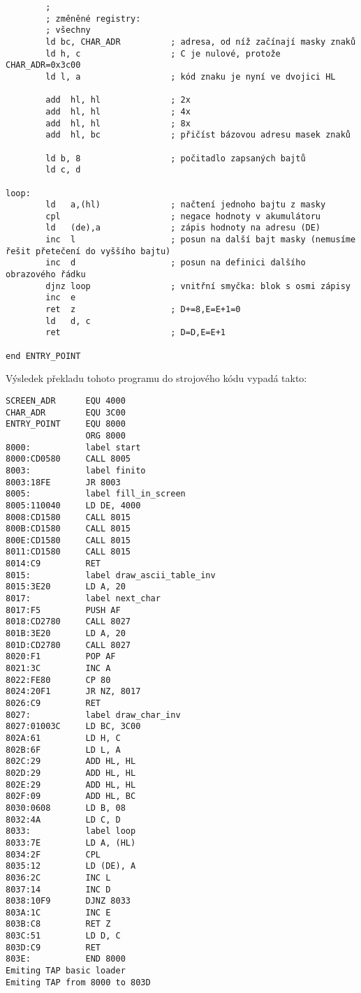 \documentclass{article}
\begin{document}
\begin{verbatim}
        ;
        ; změněné registry:
        ; všechny
        ld bc, CHAR_ADR          ; adresa, od níž začínají masky znaků
        ld h, c                  ; C je nulové, protože CHAR_ADR=0x3c00
        ld l, a                  ; kód znaku je nyní ve dvojici HL
 
        add  hl, hl              ; 2x
        add  hl, hl              ; 4x
        add  hl, hl              ; 8x
        add  hl, bc              ; přičíst bázovou adresu masek znaků
 
        ld b, 8                  ; počitadlo zapsaných bajtů
        ld c, d
 
loop:
        ld   a,(hl)              ; načtení jednoho bajtu z masky
        cpl                      ; negace hodnoty v akumulátoru
        ld   (de),a              ; zápis hodnoty na adresu (DE)
        inc  l                   ; posun na další bajt masky (nemusíme řešit přetečení do vyššího bajtu)
        inc  d                   ; posun na definici dalšího obrazového řádku
        djnz loop                ; vnitřní smyčka: blok s osmi zápisy
        inc  e
        ret  z                   ; D+=8,E=E+1=0
        ld   d, c
        ret                      ; D=D,E=E+1
 
end ENTRY_POINT
\end{verbatim}

Výsledek překladu tohoto programu do strojového kódu vypadá takto:

\begin{verbatim}
SCREEN_ADR      EQU 4000
CHAR_ADR        EQU 3C00
ENTRY_POINT     EQU 8000
                ORG 8000
8000:           label start
8000:CD0580     CALL 8005
8003:           label finito
8003:18FE       JR 8003
8005:           label fill_in_screen
8005:110040     LD DE, 4000
8008:CD1580     CALL 8015
800B:CD1580     CALL 8015
800E:CD1580     CALL 8015
8011:CD1580     CALL 8015
8014:C9         RET
8015:           label draw_ascii_table_inv
8015:3E20       LD A, 20
8017:           label next_char
8017:F5         PUSH AF
8018:CD2780     CALL 8027
801B:3E20       LD A, 20
801D:CD2780     CALL 8027
8020:F1         POP AF
8021:3C         INC A
8022:FE80       CP 80
8024:20F1       JR NZ, 8017
8026:C9         RET
8027:           label draw_char_inv
8027:01003C     LD BC, 3C00
802A:61         LD H, C
802B:6F         LD L, A
802C:29         ADD HL, HL
802D:29         ADD HL, HL
802E:29         ADD HL, HL
802F:09         ADD HL, BC
8030:0608       LD B, 08
8032:4A         LD C, D
8033:           label loop
8033:7E         LD A, (HL)
8034:2F         CPL
8035:12         LD (DE), A
8036:2C         INC L
8037:14         INC D
8038:10F9       DJNZ 8033
803A:1C         INC E
803B:C8         RET Z
803C:51         LD D, C
803D:C9         RET
803E:           END 8000
Emiting TAP basic loader
Emiting TAP from 8000 to 803D
\end{verbatim}
\end{document}
